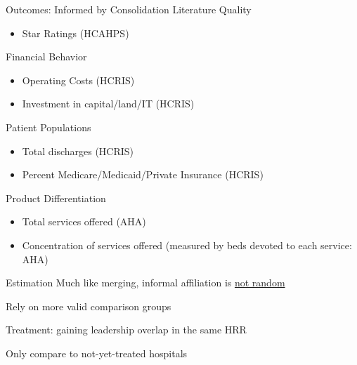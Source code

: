 \documentclass[notes,11pt, aspectratio=169]{beamer}
\newenvironment{wideitemize}{\itemize\addtolength{\itemsep}{10pt}}{\enditemize}
\begin{document}
\begin{frame}{Outcomes: Informed by Consolidation Literature}
    Quality
    \begin{itemize}
        \item Star Ratings (HCAHPS)
    \end{itemize}

    \vspace{2mm}

    Financial Behavior
    \begin{itemize}
        \item Operating Costs (HCRIS)
        \item Investment in capital/land/IT (HCRIS)
    \end{itemize}

    \vspace{2mm}

    Patient Populations
    \begin{itemize}
        \item Total discharges (HCRIS)
        \item Percent Medicare/Medicaid/Private Insurance (HCRIS)
    \end{itemize}

    \vspace{2mm}

    Product Differentiation
    \begin{itemize}
        \item Total services offered (AHA)
        \item Concentration of services offered (measured by beds devoted to each service: AHA)
    \end{itemize}
\end{frame}

\begin{frame}{Estimation}
    Much like merging, informal affiliation is \underline{not random}

    \vspace{3mm}
    \begin{wideitemize}
        \item Rely on more valid comparison groups
        \item Treatment: gaining leadership overlap in the same HRR
        \item Only compare to not-yet-treated hospitals
    \end{wideitemize}
\end{frame}
\end{document}

